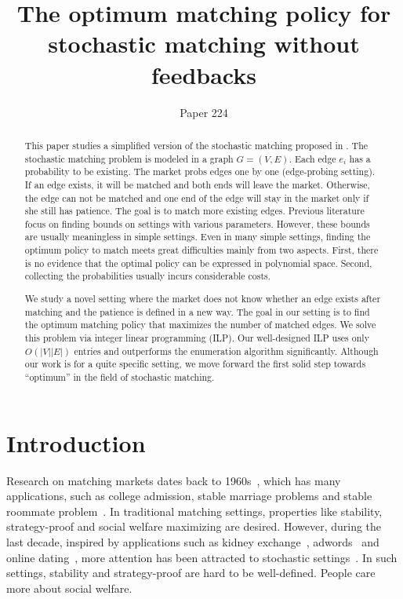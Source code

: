 \documentclass[letterpaper]{article}
\title {The optimum matching policy for stochastic matching without feedbacks}
\author {Paper 224}
\begin{document}
%

\maketitle
\begin{abstract}
This paper studies a simplified version of the stochastic matching proposed in \cite{chen2009approximating}.
The stochastic matching problem is modeled in a graph $G=(V,E)$. 
Each edge $e_i$ has a probability to be existing. 
The market probs edges one by one (edge-probing setting).
If an edge exists, it will be matched and both ends will leave the market.
Otherwise, the edge can not be matched and one end of the edge will stay in the market only if she still has patience.
The goal is to match more existing edges.
Previous literature focus on finding bounds on settings with various parameters.
However, these bounds are usually meaningless in simple settings.
Even in many simple settings, finding the optimum policy to match meets great difficulties mainly from two aspects.
First, there is no evidence that the optimal policy can be expressed in polynomial space.
Second, collecting the probabilities usually incurs considerable costs.

We study a novel setting where the market does not know whether an edge exists after matching and the patience is defined in a new way.
The goal in our setting is to find the optimum matching policy that maximizes the number of matched edges.
We solve this problem via integer linear programming (ILP).
Our well-designed ILP uses only $O(|V||E|)$ entries and outperforms the enumeration algorithm significantly.
Although our work is for a quite specific setting, we move forward the first solid step towards ``optimum'' in the field of stochastic matching.

\end{abstract}

\section{Introduction}

Research on matching markets dates back to 1960s~\cite{gale1962college}, which has many applications, such as college admission, stable marriage problems and stable roommate problem~\cite{roth1982incentive}.
In traditional matching settings, properties like stability, strategy-proof and social welfare maximizing are desired.
However, during the last decade, inspired by applications such as kidney exchange~\cite{roth2003kidney,roth2005pairwise}, adwords~\cite{mehta2007adwords} and online dating~\cite{hitsch2010matching}, more attention has been attracted to stochastic settings~\cite{awasthi2009online}.
In such settings, stability and strategy-proof are hard to be well-defined.
People care more about social welfare.
\end{document}
